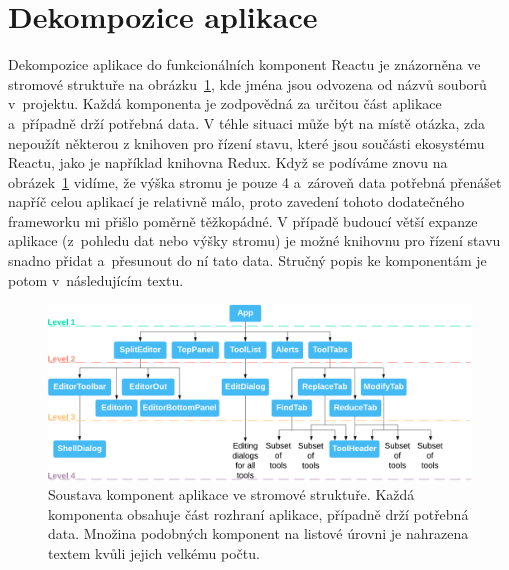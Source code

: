\section{Dekompozice aplikace}
\label{sec:Dekompozice aplikace}
Dekompozice aplikace do funkcionálních komponent Reactu je znázorněna ve stromové struktuře na obrázku~\ref{obr:Soustava komponent aplikace ve stromové struktuře}, kde jména jsou odvozena od názvů souborů v~projektu. Každá komponenta je zodpovědná za určitou část aplikace a~případně drží potřebná data. V téhle situaci může být na místě otázka, zda nepoužít některou z knihoven pro řízení stavu, které jsou součásti ekosystému Reactu, jako je například knihovna Redux. Když se podíváme znovu na obrázek~\ref{obr:Soustava komponent aplikace ve stromové struktuře} vidíme, že výška stromu je pouze 4 a~zároveň data potřebná přenášet napříč celou aplikací je relativně málo, proto zavedení tohoto dodatečného frameworku mi přišlo poměrně těžkopádné. V případě budoucí větší expanze aplikace (z~pohledu dat nebo výšky stromu) je možné knihovnu pro řízení stavu snadno přidat a~přesunout do ní tato data. Stručný popis ke komponentám je potom v~následujícím textu.
\begin{figure}[hbt]
	\centering
	\setlength{\fboxsep}{0pt}
	\includegraphics[width=1\textwidth]{obrazky-figures/dekompozice_komponent.pdf}
	\caption{Soustava komponent aplikace ve stromové struktuře. Každá komponenta obsahuje část rozhraní aplikace, případně drží potřebná data. Množina podobných komponent na listové úrovni je nahrazena textem kvůli jejich velkému počtu.}
	\label{obr:Soustava komponent aplikace ve stromové struktuře}
\end{figure}

